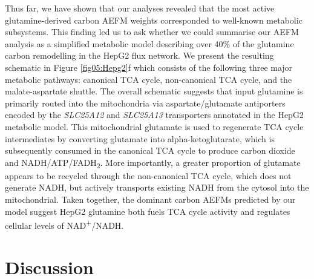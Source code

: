 \documentclass[12pt]{article}
\begin{document}
Thus far, we have shown that our analyses revealed that the most active
glutamine-derived carbon AEFM weights corresponded to well-known metabolic
subsystems. This finding led us to ask whether we could summarise our AEFM
analysis as a simplified metabolic model describing over 40\% of the
glutamine carbon remodelling in the HepG2 flux network. We present the
resulting schematic in Figure \ref{fig05:Hepg2}f which consists
of the following three major metabolic pathways: canonical TCA cycle,
non-canonical TCA cycle, and the malate-aspartate shuttle. The overall
schematic suggests that input glutamine is primarily routed into the
mitochondria via aspartate/glutamate antiporters encoded by the
\textit{SLC25A12} and \textit{SLC25A13} transporters annotated in the
HepG2 metabolic model. This mitochondrial glutamate is used to regenerate
TCA cycle intermediates by converting glutamate into alpha-ketoglutarate,
which is subsequently consumed in the canonical TCA cycle to produce
carbon dioxide and NADH/ATP/FADH\textsubscript{2}. More importantly,
a greater proportion of glutamate appears to be recycled through the
non-canonical TCA cycle, which does not generate NADH, but actively
transports existing NADH from the cytosol into the mitochondrial. Taken
together, the dominant carbon AEFMs predicted by our model suggest HepG2
glutamine both fuels TCA cycle activity and regulates cellular levels of
NAD\textsuperscript{+}/NADH.

\section*{Discussion}
\end{document}
